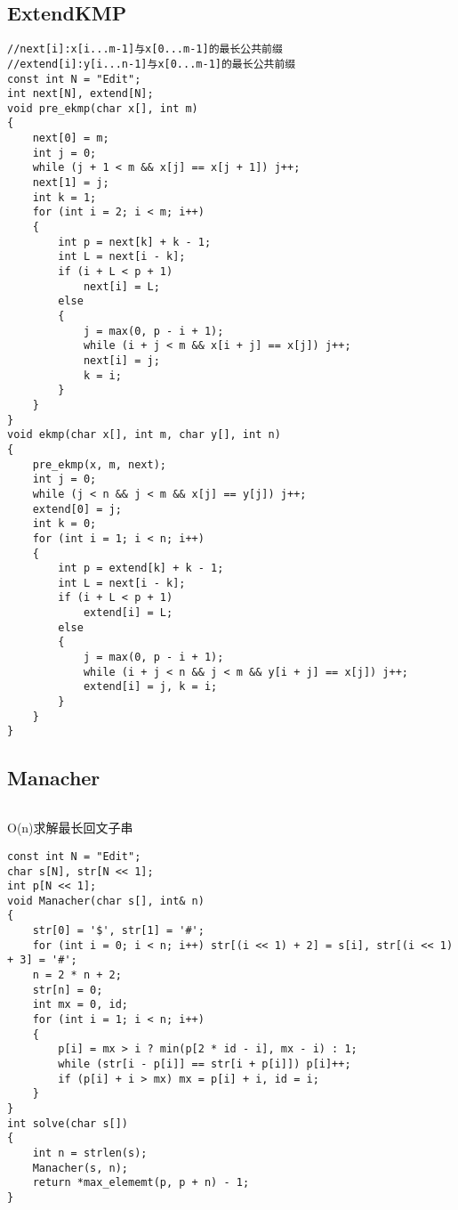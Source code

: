 \documentclass[twoside]{article}
\begin{document}
\subsection{ExtendKMP}
\begin{lstlisting}
//next[i]:x[i...m-1]与x[0...m-1]的最长公共前缀
//extend[i]:y[i...n-1]与x[0...m-1]的最长公共前缀
const int N = "Edit";
int next[N], extend[N];
void pre_ekmp(char x[], int m)
{
    next[0] = m;
    int j = 0;
    while (j + 1 < m && x[j] == x[j + 1]) j++;
    next[1] = j;
    int k = 1;
    for (int i = 2; i < m; i++)
    {
        int p = next[k] + k - 1;
        int L = next[i - k];
        if (i + L < p + 1)
            next[i] = L;
        else
        {
            j = max(0, p - i + 1);
            while (i + j < m && x[i + j] == x[j]) j++;
            next[i] = j;
            k = i;
        }
    }
}
void ekmp(char x[], int m, char y[], int n)
{
    pre_ekmp(x, m, next);
    int j = 0;
    while (j < n && j < m && x[j] == y[j]) j++;
    extend[0] = j;
    int k = 0;
    for (int i = 1; i < n; i++)
    {
        int p = extend[k] + k - 1;
        int L = next[i - k];
        if (i + L < p + 1)
            extend[i] = L;
        else
        {
            j = max(0, p - i + 1);
            while (i + j < n && j < m && y[i + j] == x[j]) j++;
            extend[i] = j, k = i;
        }
    }
}
\end{lstlisting}
\subsection{Manacher}
\begin{lstlisting}
\end{lstlisting}
O(n)求解最长回文子串
\begin{lstlisting}
const int N = "Edit";
char s[N], str[N << 1];
int p[N << 1];
void Manacher(char s[], int& n)
{
    str[0] = '$', str[1] = '#';
    for (int i = 0; i < n; i++) str[(i << 1) + 2] = s[i], str[(i << 1) + 3] = '#';
    n = 2 * n + 2;
    str[n] = 0;
    int mx = 0, id;
    for (int i = 1; i < n; i++)
    {
        p[i] = mx > i ? min(p[2 * id - i], mx - i) : 1;
        while (str[i - p[i]] == str[i + p[i]]) p[i]++;
        if (p[i] + i > mx) mx = p[i] + i, id = i;
    }
}
int solve(char s[])
{
    int n = strlen(s);
    Manacher(s, n);
    return *max_elememt(p, p + n) - 1;
}
\end{lstlisting}
\end{document}
